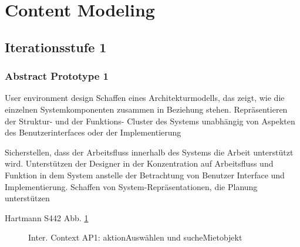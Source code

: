 
\section{Content Modeling}

\subsection{Iterationsstufe 1}
\subsubsection{Abstract Prototype 1}

User environment design Schaffen eines Architekturmodells, das zeigt, wie die einzelnen Systemkomponenten zusammen in Beziehung stehen. Repräsentieren der Struktur- und der Funktions- Cluster des Systems unabhängig von Aspekten des Benutzerinterfaces 
oder der Implementierung

Sicherstellen, dass der Arbeitsfluss innerhalb des Systems die Arbeit unterstützt wird. Unterstützen der Designer in der Konzentration auf Arbeitsfluss und Funktion in dem System anstelle der Betrachtung von Benutzer Interface und Implementierung. Schaffen von System-Repräsentationen, die Planung unterstützen

Hartmann S442
Abb. \ref{interfaceContents1}

\begin{figure}[H]
\centering
\hfill
{}
\hfill %
\hfill %
\caption{Inter. Context AP1: aktionAuswählen und sucheMietobjekt }
\label{interfaceContents1}
\end{figure}

